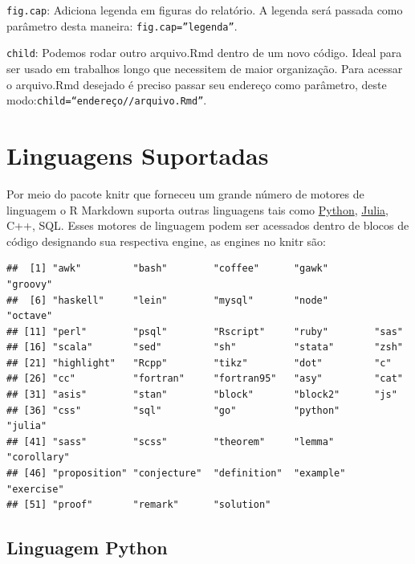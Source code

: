 \documentclass[
]{book}
\newenvironment{Shaded}{\begin{snugshade}}{\end{snugshade}}
\newcommand{\KeywordTok}[1]{\textcolor[rgb]{0.13,0.29,0.53}{\textbf{#1}}}
\newcommand{\NormalTok}[1]{#1}
\newcommand{\OperatorTok}[1]{\textcolor[rgb]{0.81,0.36,0.00}{\textbf{#1}}}
\begin{document}
\texttt{fig.cap}: Adiciona legenda em figuras do relatório. A legenda será passada como parâmetro desta maneira: \texttt{fig.cap=”legenda”}.

\texttt{child}: Podemos rodar outro arquivo.Rmd dentro de um novo código. Ideal para ser usado em trabalhos longo que necessitem de maior organização. Para acessar o arquivo.Rmd desejado é preciso passar seu endereço como parâmetro, deste modo:\texttt{child=“endereço//arquivo.Rmd”}.

\hypertarget{linguagens-suportadas}{%
\section{Linguagens Suportadas}\label{linguagens-suportadas}}

Por meio do pacote knitr que forneceu um grande número de motores de linguagem o R Markdown suporta outras linguagens tais como \href{https://www.python.org/}{Python}, \href{https://julialang.org/}{Julia}, C++, SQL. Esses motores de linguagem podem ser acessados dentro de blocos de código designando sua respectiva engine, as engines no knitr são:

\begin{Shaded}
\end{Shaded}

\begin{verbatim}
##  [1] "awk"         "bash"        "coffee"      "gawk"        "groovy"     
##  [6] "haskell"     "lein"        "mysql"       "node"        "octave"     
## [11] "perl"        "psql"        "Rscript"     "ruby"        "sas"        
## [16] "scala"       "sed"         "sh"          "stata"       "zsh"        
## [21] "highlight"   "Rcpp"        "tikz"        "dot"         "c"          
## [26] "cc"          "fortran"     "fortran95"   "asy"         "cat"        
## [31] "asis"        "stan"        "block"       "block2"      "js"         
## [36] "css"         "sql"         "go"          "python"      "julia"      
## [41] "sass"        "scss"        "theorem"     "lemma"       "corollary"  
## [46] "proposition" "conjecture"  "definition"  "example"     "exercise"   
## [51] "proof"       "remark"      "solution"
\end{verbatim}

\hypertarget{linguagem-python}{%
\subsection{Linguagem Python}\label{linguagem-python}}
\end{document}
